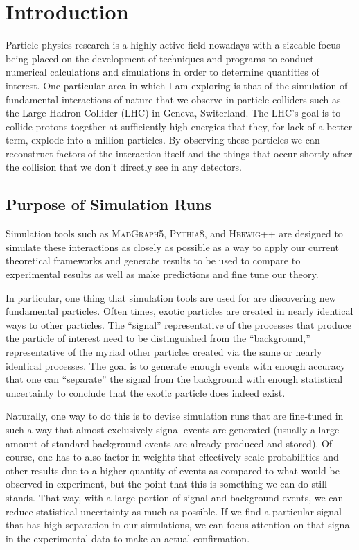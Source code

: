 \section{Introduction}

Particle physics research is a highly active field nowadays with a sizeable focus being placed on the development of techniques and programs to conduct numerical calculations and simulations in order to determine quantities of interest. One particular area in which I am exploring is that of the simulation of fundamental interactions of nature that we observe in particle colliders such as the Large Hadron Collider (LHC) in Geneva, Switerland. The LHC's goal is to collide protons together at sufficiently high energies that they, for lack of a better term, explode into a million particles. By observing these particles we can reconstruct factors of the interaction itself and the things that occur shortly after the collision that we don't directly see in any detectors.

\subsection{Purpose of Simulation Runs}

Simulation tools such as \textsc{MadGraph5}, \textsc{Pythia8}, and \textsc{Herwig++} are designed to simulate these interactions as closely as possible as a way to apply our current theoretical frameworks and generate results to be used to compare to experimental results as well as make predictions and fine tune our theory.

In particular, one thing that simulation tools are used for are discovering new fundamental particles. Often times, exotic particles are created in nearly identical ways to other particles. The ``signal'' representative of the processes that produce the particle of interest need to be distinguished from the ``background,'' representative of the myriad other particles created via the same or nearly identical processes. The goal is to generate enough events with enough accuracy that one can ``separate'' the signal from the background with enough statistical uncertainty to conclude that the exotic particle does indeed exist.

Naturally, one way to do this is to devise simulation runs that are fine-tuned in such a way that almost exclusively signal events are generated (usually a large amount of standard background events are already produced and stored). Of course, one has to also factor in weights that effectively scale probabilities and other results due to a higher quantity of events as compared to what would be observed in experiment, but the point that this is something we can do still stands. That way, with a large portion of signal and background events, we can reduce statistical uncertainty as much as possible. If we find a particular signal that has high separation in our simulations, we can focus attention on that signal in the experimental data to make an actual confirmation.

